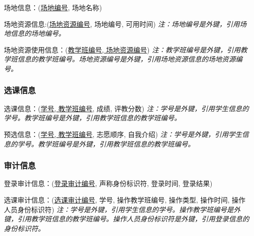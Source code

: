 \textsf{场地信息：}(\uline{场地编号}, 场地名称)

\textsf{场地资源信息:}(\uline{场地资源编号}, 场地编号, 可用时间)
\textsl{注：场地编号是外键，引用场地信息的场地编号。}

\textsf{场地资源使用信息：}(\uline{教学班编号, 场地资源编号})
\textsl{注：教学班编号是外键，引用教学班信息的教学班编号。场地资源编号是外键，引用场地资源信息的场地资源编号。}

\subsubsection{选课信息}
\textsf{选课信息：}(\uline{学号, 教学班编号}, 成绩, 评教分数)
\textsl{注：学号是外键，引用学生信息的学号。教学班编号是外键，引用教学班信息的教学班编号。}

\textsf{预选信息：}(\uline{学号, 教学班编号}, 志愿顺序, 自我介绍)
\textsl{注：学号是外键，引用学生信息的学号。教学班编号是外键，引用教学班信息的教学班编号。}

\subsubsection{审计信息}
\textsf{登录审计信息：}(\uline{登录审计编号}, 声称身份标识符, 登录时间, 登录结果)

\textsf{选课审计信息：}(\uline{选课审计编号}, 学号, 操作教学班编号, 操作类型, 操作时间, 操作人员身份标识符)
\textsl{注：学号是外键，引用学生信息的学号。操作教学班编号是外键，引用教学班信息的教学班编号。操作人员身份标识符是外键，引用登录信息的身份标识符。}
